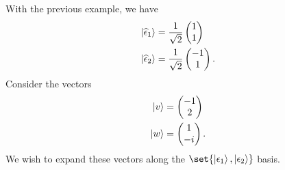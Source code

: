 \documentclass[10pt]{mypackage}
\begin{document}
\begin{example}
With the previous example, we have
\begin{align*}
  \ket{\widehat{\epsilon}_1} &= \frac{1}{\sqrt{2}}\begin{pmatrix}1\\1\end{pmatrix}\\
  \ket{\widehat{\epsilon}_2} &= \frac{1}{\sqrt{2}} \begin{pmatrix}-1\\1\end{pmatrix}.
\end{align*}
Consider the vectors
\begin{align*}
  \ket{v} &= \begin{pmatrix}-1\\2\end{pmatrix}\\
  \ket{w} &= \begin{pmatrix}1\\-i\end{pmatrix}.
\end{align*}
We wish to expand these vectors along the $\set{\ket{\epsilon_1},\ket{\epsilon_2}}$ basis.\newline


\end{example}
\end{document}
